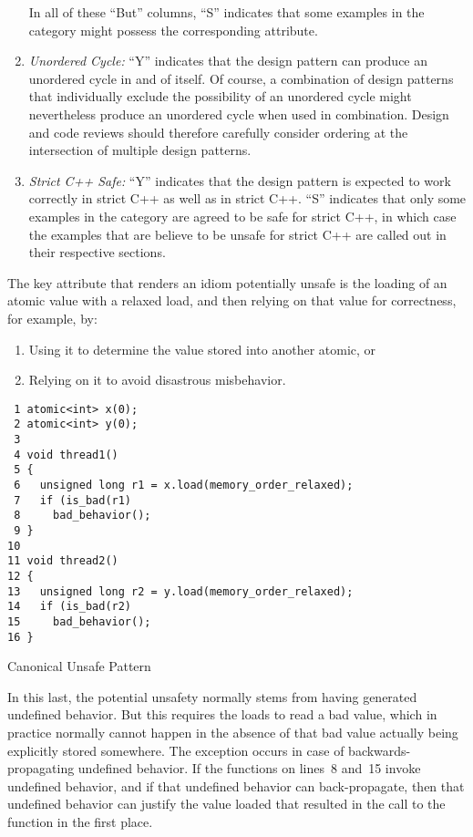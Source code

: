\documentclass[10]{article}
\begin{document}
\begin{enumerate}
	In all of these ``But'' columns, ``S'' indicates
	that some examples in the category might possess the corresponding
	attribute.
\item	\emph{Unordered Cycle:}  ``Y'' indicates that the design pattern
	can produce an unordered cycle in and of itself.
	Of course, a combination of design patterns that individually
	exclude the possibility of an unordered cycle might nevertheless
	produce an unordered cycle when used in combination.
	Design and code reviews should therefore carefully consider
	ordering at the intersection of multiple design patterns.
\item	\emph{Strict C++ Safe:} ``Y'' indicates that the design pattern is
	expected to work correctly in strict C++ as well as in strict C++.
	``S'' indicates that only some examples in the category are
	agreed to be safe for strict C++, in which case the examples
	that are believe to be unsafe for strict C++ are called out in
	their respective sections.
\end{enumerate}

The key attribute that renders an idiom potentially unsafe is
the loading of an atomic value with a relaxed load, and then
relying on that value for correctness, for example, by:

\begin{enumerate}
\item	Using it to determine the value stored into another atomic, or
\item	Relying on it to avoid disastrous misbehavior.
\end{enumerate}

\begin{listing}[tbp]
\begin{verbatim}
 1 atomic<int> x(0);
 2 atomic<int> y(0);
 3
 4 void thread1()
 5 {
 6   unsigned long r1 = x.load(memory_order_relaxed);
 7   if (is_bad(r1)
 8     bad_behavior();
 9 }
10
11 void thread2()
12 {
13   unsigned long r2 = y.load(memory_order_relaxed);
14   if (is_bad(r2)
15     bad_behavior();
16 }
\end{verbatim}
\caption{Canonical Unsafe Pattern}
\label{lst:Canonical Unsafe Pattern}
\end{listing}

In this last, the potential unsafety normally stems from having
generated undefined behavior.
But this requires the loads to read a bad value, which in practice
normally cannot happen in the absence of that bad value actually being
explicitly stored somewhere.
The exception occurs in case of backwards-propagating undefined behavior.
If the  functions on lines~8 and~15 invoke undefined
behavior, and if that undefined behavior can back-propagate, then that
undefined behavior can justify the value loaded that resulted in the
call to the  function in the first place.
\end{document}
